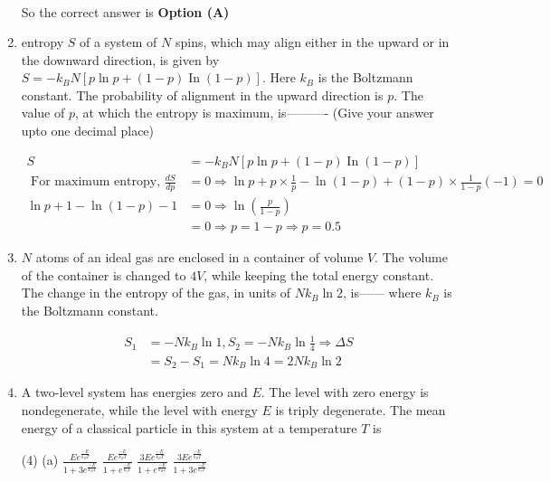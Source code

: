 \begin{enumerate}
\begin{answer}
\begin{align*}
		\end{align*}
		So the correct answer is \textbf{Option (A)}
	\end{answer}	
	\item entropy $S$ of a system of $N$ spins, which may align either in the upward or in the downward direction, is given by $S=-k_{B} N[p \ln p+(1-p) \operatorname{In}(1-p)] .$ Here $k_{B}$ is the Boltzmann constant. The probability of alignment in the upward direction is $p$. The value of $p$, at which the entropy is maximum, is---------- (Give your answer upto one decimal place)
	{}
	\begin{answer}
		\begin{align*}
		S&=-k_{B} N[p \ln p+(1-p) \operatorname{In}(1-p)]\\
		\text{	For maximum entropy, }\frac{d S}{d p}&=0 \Rightarrow \ln p+p \times \frac{1}{p}-\ln (1-p)+(1-p) \times \frac{1}{1-p}(-1)=0\\
		\ln p+1-\ln (1-p)-1&=0 \Rightarrow \ln \left(\frac{p}{1-p}\right)\\&=0 \Rightarrow p=1-p \Rightarrow p=0.5
		\end{align*}
	\end{answer}
	\item 	$N$ atoms of an ideal gas are enclosed in a container of volume $V$. The volume of the container is changed to $4 V$, while keeping the total energy constant. The change in the entropy of the gas, in units of $N k_{B} \ln 2$, is------ where $k_{B}$ is the Boltzmann constant.
	{}
	\begin{answer}
		\begin{align*}
		S_{1}&=-N k_{B} \ln 1, S_{2}=-N k_{B} \ln \frac{1}{4} \Rightarrow \Delta S\\&=S_{2}-S_{1}=N k_{B} \ln 4=2 N k_{B} \ln 2
		\end{align*}
	\end{answer}
	\item A two-level system has energies zero and $E$. The level with zero energy is nondegenerate, while the level with energy $E$ is triply degenerate. The mean energy of a classical particle in this system at a temperature $T$ is
	{}
	\begin{tasks}(4)
		\task[\textbf{A.}] (a) $\frac{E e^{\frac{-E}{k_{B} T}}}{1+3 e^{\frac{-E}{k_{B} T}}}$
		\task[\textbf{B.}] $\frac{E e^{\frac{-E}{k_{B} T}}}{1+e^{\frac{-E}{k_{s} T}}}$
		\task[\textbf{C.}] $\frac{3 E e^{\frac{-E}{k_{B} T}}}{1+e^{\frac{-E}{k_{B} T}}}$
		\task[\textbf{D.}] $\frac{3 E e^{\frac{-E}{k_{B} T}}}{1+3 e^{\frac{-E}{k_{s} T}}}$

\end{tasks}
\end{enumerate}
